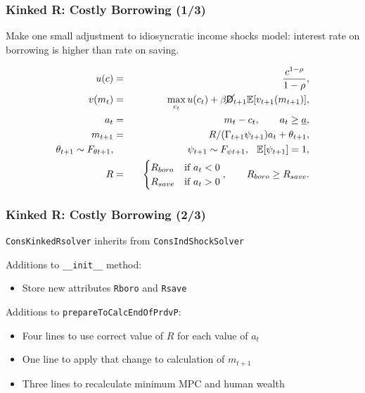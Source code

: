 \documentclass[11ptt]{beamer}
\newcommand{\E}{\mathbb{E}}
\newcommand{\Die}{\mathsf{D}}
\newcommand{\Live}{\cancel{\Die}}
\begin{document}
\begin{frame}
\frametitle{Kinked R: Costly Borrowing (1/3)}
Make one small adjustment to idiosyncratic income shocks model: interest rate on borrowing is higher than rate on saving.

\begin{eqnarray*}
u(c) &=& \frac{c^{1-\rho}}{1-\rho}, \\
v(m_t) &=& \max_{c_t} u(c_t) + \beta \Live_{t+1} \E [v_{t+1}(m_{t+1}) ], \\
a_t &=& m_t - c_t, \qquad a_t \geq \underline{a}, \\
m_{t+1} &=& R/(\Gamma_{t+1} \psi_{t+1}) a_t + \theta_{t+1}, \\
\theta_{t+1} \sim F_{\theta t+1}, &\qquad& \psi_{t+1} \sim F_{\psi t+1}, \hspace{0.25cm} \E[\psi_{t+1}] = 1, \\
R &=& \begin{cases}
R_{boro} & \text{if  } a_t < 0 \\
R_{save} & \text{if  } a_t > 0
\end{cases}, \qquad R_{boro} \geq R_{save}.
\end{eqnarray*}
\end{frame}


\begin{frame}
\frametitle{Kinked R: Costly Borrowing (2/3)}
\texttt{ConsKinkedRsolver} inherits from \texttt{ConsIndShockSolver}

\begin{block}{Additions to \texttt{\_\_init\_\_} method:}
\begin{itemize}
\item Store new attributes \texttt{Rboro} and \texttt{Rsave}
\end{itemize}
\end{block}
\begin{block}{Additions to \texttt{prepareToCalcEndOfPrdvP}:}
\begin{itemize}
\item Four lines to use correct value of $R$ for each value of $a_t$

\item One line to apply that change to calculation of $m_{t+1}$

\item Three lines to recalculate minimum MPC and human wealth
\end{itemize}
\end{block}
\end{frame}
\end{document}
